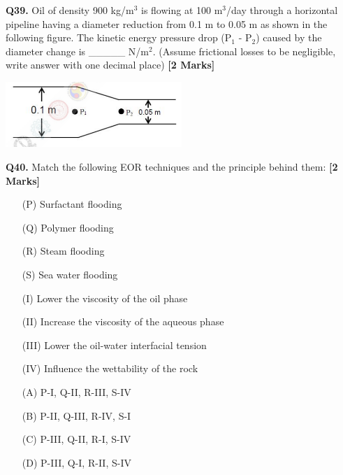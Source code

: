 \documentclass[11pt]{article}
\newcommand{\questionb}[2]{
    \noindent\textbf{Q#2.} #1 \hfill \textbf{[2 Marks]}
}
\begin{document}
\questionb{Oil of density 900 kg/m\(^3\) is flowing at 100 m\(^3\)/day through a horizontal pipeline having a diameter reduction from 0.1 m to 0.05 m as shown in the following figure. The kinetic energy pressure drop (P\(_1\) - P\(_2\)) caused by the diameter change is \_\_\_\_\_ N/m\(^2\). (Assume frictional losses to be negligible, write answer with one decimal place)}{39}
\begin{center}
\includegraphics[width=0.5\textwidth]{figures/39.png}
\end{center}
\vspace{0.5cm}

\questionb{Match the following EOR techniques and the principle behind them:}{40}
\begin{enumerate}
    \item[(P)] Surfactant flooding
    \item[(Q)] Polymer flooding
    \item[(R)] Steam flooding
    \item[(S)] Sea water flooding
    \item[(I)] Lower the viscosity of the oil phase
    \item[(II)] Increase the viscosity of the aqueous phase
    \item[(III)] Lower the oil-water interfacial tension
    \item[(IV)] Influence the wettability of the rock
    \item[(A)] P-I, Q-II, R-III, S-IV
    \item[(B)] P-II, Q-III, R-IV, S-I
    \item[(C)] P-III, Q-II, R-I, S-IV
    \item[(D)] P-III, Q-I, R-II, S-IV
\end{enumerate}
\vspace{0.5cm}
\end{document}
